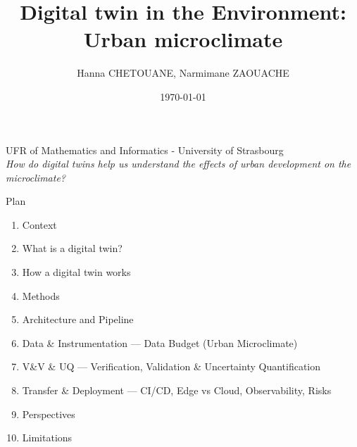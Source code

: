 \documentclass{beamer}
\author[Digital twin in the Environment]{\large Hanna CHETOUANE, Narmimane ZAOUACHE \\ \vspace{-0.8cm} \date{\today}}
\title[Urban mocroclimate]{\textbf{Digital twin in the Environment:} \\ Urban microclimate}
\begin{document}
\begin{frame}
    \titlepage
    \vspace{-0.7cm}
    \begin{center}
        UFR of Mathematics and Informatics - University of Strasbourg 
        \\[0.6cm] 
        \textit{How do digital twins help us understand the effects of urban development on the microclimate?}
    \end{center}
\end{frame} 


\begin{frame}{Plan}
    \begin{enumerate}
        \item Context
        \item What is a digital twin?
        \item How a digital twin works
        \item Methods
        \item Architecture and Pipeline
        \item Data \& Instrumentation — Data Budget (Urban Microclimate)
        \item V\&V \& UQ — Verification, Validation \& Uncertainty Quantification
        \item Transfer \& Deployment — CI/CD, Edge vs Cloud, Observability, Risks
        \item Perspectives
        \item Limitations
    \end{enumerate}
\end{frame}
\end{document}
